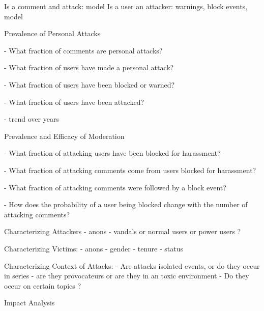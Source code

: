 
Is a comment and attack: model
Is a user an attacker: warnings, block events, model



Prevalence of Personal Attacks


- What fraction of comments are personal attacks?

- What fraction of users have made a personal attack?

- What fraction of users have been blocked or warned?

- What fraction of users have been attacked?

- trend over years



Prevalence and Efficacy of Moderation

- What fraction of attacking users have been blocked for harassment?

- What fraction of attacking comments come from users blocked for harassment?

- What fraction of attacking comments were followed by a block event?

- How does the probability of a user being blocked change with the number of attacking comments?


Characterizing Attackers
- anons 
- vandals or normal users or power users ? 


Characterizing Victims:
 - anons
 - gender
 - tenure
 - status


Characterizing Context of Attacks:
 - Are attacks isolated events, or do they occur in series
 - are they provocateurs or are they in an toxic environment
 - Do they occur on certain topics ?



Impact Analysis




